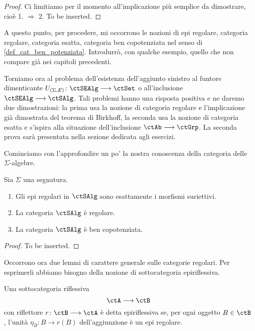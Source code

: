 \begin{proof}
	Ci limitiamo per il momento all'implicazione più semplice da dimostrare, cioè 1. \(\Rightarrow\) 2. To be inserted.
\end{proof}

\begin{warning}\label{caveat_reg_ex}
	A questo punto, per procedere, mi occorrono le nozioni di epi regolare, categoria regolare, categoria esatta, categoria
	ben copotenziata nel senso di \ref{def_cat_ben_potenziata}. Introdurrò, con qualche esempio, quello che non compare già
	nei capitoli precedenti.
\end{warning}

Torniamo ora al problema dell'esistenza dell'aggiunto sinistro al funtore dimenticante \(U_{(\Sigma,E)} \colon \ctSEAlg \fun \ctSet\)
o all'inclusione \(\ctSEAlg \fun \ctSAlg\). Tali problemi hanno una risposta positiva e ne daremo due dimostrazioni: la prima usa la
nozione di categoria regolare e l'implicazione già dimostrata del teorema di Birkhoff, la seconda usa la nozione di categoria esatta e
s'ispira alla situazione dell'inclusione \(\ctAb \fun \ctGrp\). La seconda prova sarà presentata nella sezione dedicata agli esercizi.

Cominciamo con l'approfondire un po' la nostra conoscenza della categoria delle \(\Sigma\)-algebre.

\begin{proposition}\label{prop_alg_reg}
	Sia \(\Sigma\) una segnatura.
	\begin{enumerate}
		\item Gli epi regolari in \(\ctSAlg\) sono esattamente i morfismi suriettivi.
		\item La categoria \(\ctSAlg\) è regolare.
		\item La categoria \(\ctSAlg\) è ben copotenziata.
	\end{enumerate}
\end{proposition}

\begin{proof}
	To be inserted.
\end{proof}

Occorrono ora due lemmi di carattere generale sulle categorie regolari. Per esprimerli abbiamo bisogno della nozione di
sottocategoria epiriflessiva.

\begin{definition}\label{def_sottocat_epirifl}
	Una sottocategoria riflessiva
	\[
		\ctA \fun \ctB
	\]
	con riflettore \(r \colon \ctB \fun \ctA\) è detta epiriflessiva se, per ogni oggetto \(B \in \ctB\), l'unità \(\eta_B \colon B \to r(B)\)
	dell'aggiunzione è un epi regolare.
\end{definition}

